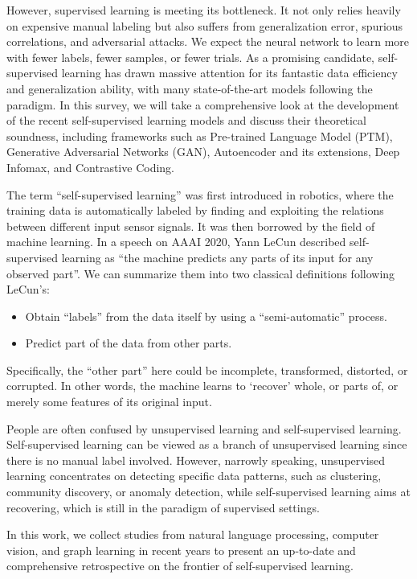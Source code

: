 \documentclass[conference]{IEEEtran}
\begin{document}
However, supervised learning is meeting its bottleneck.
It not only relies heavily on expensive manual labeling but also suffers from generalization error, spurious correlations, and adversarial attacks. 
We expect the neural network to learn more with fewer labels, fewer samples, or fewer trials.
As a promising candidate, self-supervised learning has drawn massive attention for its fantastic data efficiency and generalization ability, with many state-of-the-art models following the paradigm.
In this survey, we will take a comprehensive look at the development of the recent self-supervised learning models and discuss their theoretical soundness, including frameworks such as Pre-trained Language Model (PTM), Generative Adversarial Networks (GAN), Autoencoder and its extensions, Deep Infomax, and Contrastive Coding.

The term ``self-supervised learning'' was first introduced in robotics, where the training data is automatically labeled by finding and exploiting the relations between different input sensor signals.
It was then borrowed by the field of machine learning. In a speech on AAAI 2020, Yann LeCun described self-supervised learning as ``the machine predicts any parts of its input for any observed part''.
We can summarize them into two classical definitions following LeCun's:
\begin{itemize}
    \item Obtain ``labels'' from the data itself by using a ``semi-automatic'' process.
    \item Predict part of the data from other parts.
\end{itemize}
Specifically, the ``other part'' here could be incomplete, transformed, distorted, or corrupted.
In other words, the machine learns to `recover' whole, or parts of, or merely some features of its original input.

People are often confused by unsupervised learning and self-supervised learning. 
Self-supervised learning can be viewed as a branch of unsupervised learning since there is no manual label involved.
However, narrowly speaking, unsupervised learning concentrates on detecting specific data patterns, such as clustering, community discovery, or anomaly detection, while self-supervised learning aims at recovering, which is still in the paradigm of supervised settings.

In this work, we collect studies from natural language processing, computer vision, and graph learning in recent years to present an up-to-date and comprehensive retrospective on the frontier of self-supervised learning.
\end{document}

